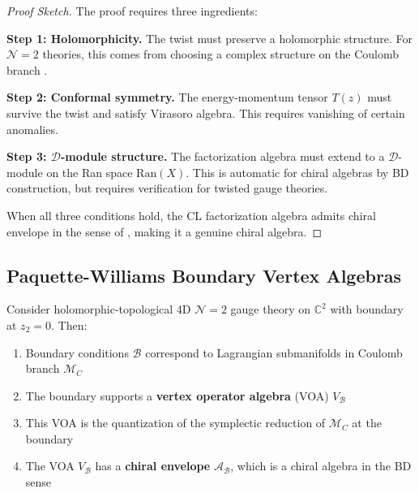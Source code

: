 \begin{proof}[Proof Sketch]
The proof requires three ingredients:

\textbf{Step 1: Holomorphicity.} The twist must preserve a holomorphic structure. 
For $\mathcal{N}=2$ theories, this comes from choosing a complex structure on the 
Coulomb branch \cite{Gai19}.

\textbf{Step 2: Conformal symmetry.} The energy-momentum tensor $T(z)$ must survive 
the twist and satisfy Virasoro algebra. This requires vanishing of certain anomalies.

\textbf{Step 3: $\mathcal{D}$-module structure.} The factorization algebra must 
extend to a $\mathcal{D}$-module on the Ran space $\text{Ran}(X)$. This is 
automatic for chiral algebras by BD construction, but requires verification for 
twisted gauge theories.

When all three conditions hold, the CL factorization algebra admits chiral envelope 
in the sense of , making it a genuine chiral algebra.
\end{proof}

\subsection{Paquette-Williams Boundary Vertex Algebras}

\begin{theorem}\label{thm:paquette-williams-boundaries}
\cite{PW22} Consider holomorphic-topological 4D $\mathcal{N}=2$ gauge theory on 
$\mathbb{C}^2$ with boundary at $z_2 = 0$. Then:
\begin{enumerate}
\item Boundary conditions $\mathcal{B}$ correspond to Lagrangian submanifolds in 
      Coulomb branch $\mathcal{M}_C$
      
\item The boundary supports a \textbf{vertex operator algebra} (VOA) $V_{\mathcal{B}}$

\item This VOA is the quantization of the symplectic reduction of $\mathcal{M}_C$ 
      at the boundary
      
\item The VOA $V_{\mathcal{B}}$ has a \textbf{chiral envelope} $\mathcal{A}_{\mathcal{B}}$, 
      which is a chiral algebra in the BD sense
\end{enumerate}
\end{theorem}

